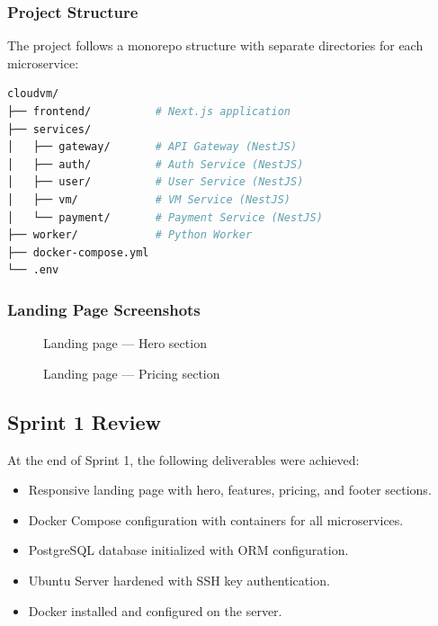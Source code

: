 \subsubsection{Project Structure}

The project follows a monorepo structure with separate directories for each microservice:

\begin{lstlisting}[language=bash, caption={Project directory structure}]
cloudvm/
├── frontend/          # Next.js application
├── services/
│   ├── gateway/       # API Gateway (NestJS)
│   ├── auth/          # Auth Service (NestJS)
│   ├── user/          # User Service (NestJS)
│   ├── vm/            # VM Service (NestJS)
│   └── payment/       # Payment Service (NestJS)
├── worker/            # Python Worker
├── docker-compose.yml
└── .env
\end{lstlisting}

\subsubsection{Landing Page Screenshots}

\begin{figure}[H]
\centering
{}
\caption{Landing page — Hero section}
\label{fig:landing-hero}
\end{figure}

\begin{figure}[H]
\centering
{}
\caption{Landing page — Pricing section}
\label{fig:landing-pricing}
\end{figure}

\subsection{Sprint 1 Review}

At the end of Sprint 1, the following deliverables were achieved:
\begin{itemize}
  \item Responsive landing page with hero, features, pricing, and footer sections.
  \item Docker Compose configuration with containers for all microservices.
  \item PostgreSQL database initialized with ORM configuration.
  \item Ubuntu Server hardened with SSH key authentication.
  \item Docker installed and configured on the server.
\end{itemize}


